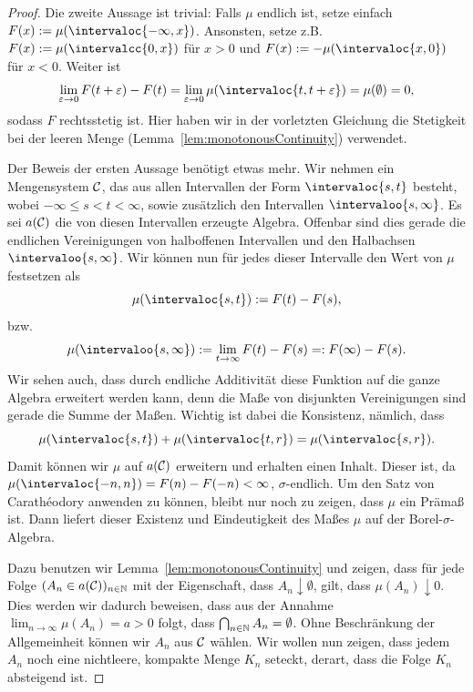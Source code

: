 \documentclass[language=ngerman]{../../Template/TemplateLecture}
\begin{document}
\begin{proof}
    Die zweite Aussage ist trivial: Falls $\mu$ endlich ist, setze einfach $F(x) := \mu(\intervaloc{-\infty,x})$. Ansonsten, setze z.B. $F(x) := \mu(\intervalcc{0,x})$ für $x > 0$ und $F(x) := -\mu(\intervaloc{x,0})$ für $x < 0$. Weiter ist 
    \begin{equation}
        \lim_{\varepsilon \to 0} F(t + \varepsilon) - F(t) = \lim_{\varepsilon \to 0} \mu(\intervaloc{t,t+\varepsilon}) = \mu(\emptyset) = 0,
    \end{equation}
    sodass $F$ rechtsstetig ist. Hier haben wir in der vorletzten Gleichung die Stetigkeit bei der leeren Menge (Lemma~\ref{lem:monotonousContinuity}) verwendet.

    Der Beweis der ersten Aussage benötigt etwas mehr. Wir nehmen ein Mengensystem $\mathcal{C}$, das aus allen Intervallen der Form $\intervaloc{s,t}$ besteht, wobei $-\infty \leq s < t < \infty$, sowie zusätzlich den Intervallen $\intervaloo{s,\infty}$. Es sei $a(\mathcal{C})$ die von diesen Intervallen erzeugte Algebra. 
    Offenbar sind dies gerade die endlichen Vereinigungen von halboffenen Intervallen und den Halbachsen $\intervaloo{s,\infty}$. Wir können nun für jedes dieser Intervalle den Wert von $\mu$ festsetzen als 
    \begin{equation}
        \mu(\intervaloc{s,t}) := F(t) - F(s),
    \end{equation}
    bzw. 
    \begin{equation}
        \mu(\intervaloo{s,\infty}) := \lim_{t \to \infty} F(t) - F(s) =: F(\infty) - F(s).
    \end{equation}
    Wir sehen auch, dass durch endliche Additivität diese Funktion auf die ganze Algebra erweitert werden kann, denn die Maße von disjunkten Vereinigungen sind gerade die Summe der Maßen. Wichtig ist dabei die Konsistenz, nämlich, dass
    \begin{equation}
        \mu(\intervaloc{s,t}) + \mu(\intervaloc{t,r}) = \mu(\intervaloc{s,r}).
    \end{equation}
    Damit können wir $\mu$ auf $a(\mathcal{C})$ erweitern und erhalten einen Inhalt. Dieser ist, da $\mu(\intervaloc{-n,n}) = F(n) - F(-n) < \infty$, $\sigma$-endlich. Um den Satz von Carathéodory anwenden zu können, bleibt nur noch zu zeigen, dass $\mu$ ein Prämaß ist. Dann liefert dieser Existenz und Eindeutigkeit des Maßes $\mu$ auf der Borel-$\sigma$-Algebra.

    Dazu benutzen wir Lemma~\ref{lem:monotonousContinuity} und zeigen, dass für jede Folge $(A_n \in a(\mathcal{C}))_{n \in \mathbb{N}}$ mit der Eigenschaft, dass $A_n \downarrow \emptyset$, gilt, dass $\mu(A_n) \downarrow 0$. Dies werden wir dadurch beweisen, dass aus der Annahme $\lim_{n \to \infty} \mu(A_n) = a > 0$ folgt, dass $\bigcap_{n \in \mathbb{N}} A_n = \emptyset$. 
    Ohne Beschränkung der Allgemeinheit können wir $A_n$ aus $\mathcal{C}$ wählen. Wir wollen nun zeigen, dass jedem $A_n$ noch eine nichtleere, kompakte Menge $K_n$ seteckt, derart, dass die Folge $K_n$ absteigend ist.


\end{proof}
\end{document}
